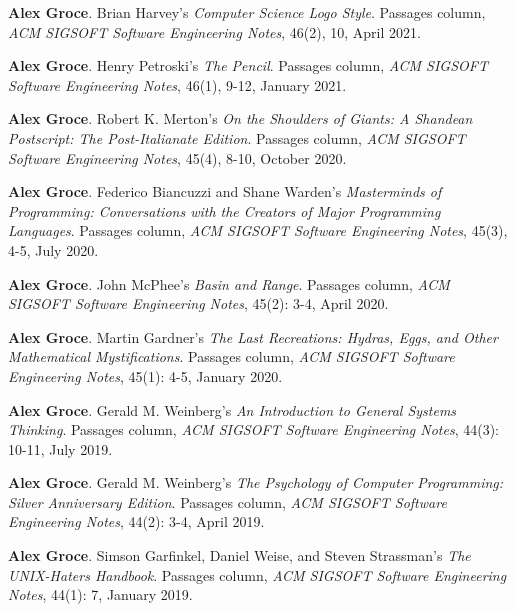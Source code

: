 \documentclass[ComputerScience]{vita}
\begin{document}
\begin{vita}
\begin{Columns, Book Reviews, and Magazine Articles}
\item {\bf Alex Groce}. 
\newblock Brian Harvey's \emph{Computer Science Logo Style}. 
\newblock Passages column, \emph{ACM SIGSOFT Software Engineering 
  Notes}, 46(2), 10, April 2021.

\item {\bf Alex Groce}. 
\newblock Henry Petroski's \emph{The Pencil}. 
\newblock Passages column, \emph{ACM SIGSOFT Software Engineering 
  Notes}, 46(1), 9-12, January 2021.
  
\item {\bf Alex Groce}. 
\newblock Robert K. Merton's \emph{On the Shoulders of Giants: A
  Shandean Postscript: The Post-Italianate Edition}. 
\newblock Passages column, \emph{ACM SIGSOFT Software Engineering 
  Notes}, 45(4), 8-10, October 2020.

\item {\bf Alex Groce}. 
\newblock Federico Biancuzzi and Shane Warden's \emph{Masterminds of 
  Programming: Conversations with the Creators of Major Programming Languages}. 
\newblock Passages column, \emph{ACM SIGSOFT Software Engineering 
  Notes}, 45(3), 4-5, July 2020.
  
\item {\bf Alex Groce}. 
\newblock John McPhee's \emph{Basin and Range}. 
\newblock Passages column, \emph{ACM SIGSOFT Software Engineering 
  Notes}, 45(2): 3-4, April 2020.
  
\item {\bf Alex Groce}. 
\newblock Martin Gardner's \emph{The Last Recreations: Hydras, Eggs, and Other Mathematical Mystifications}. 
\newblock Passages column, \emph{ACM SIGSOFT Software Engineering 
  Notes}, 45(1): 4-5, January 2020.
  
\item {\bf Alex Groce}. 
\newblock Gerald M. Weinberg's \emph{An Introduction to General
  Systems Thinking}.
\newblock Passages column, \emph{ACM SIGSOFT Software Engineering
  Notes}, 44(3): 10-11, July 2019.
  
\item {\bf Alex Groce}. 
\newblock Gerald M. Weinberg's \emph{The Psychology of Computer
  Programming: Silver Anniversary Edition}.
\newblock Passages column, \emph{ACM SIGSOFT Software Engineering
  Notes}, 44(2): 3-4, April 2019.
  
\item {\bf Alex Groce}.
\newblock Simson Garfinkel, Daniel Weise, and Steven Strassman's \emph{The UNIX-Haters Handbook}. 
\newblock Passages column, \emph{ACM SIGSOFT Software Engineering 
  Notes}, 44(1): 7, January 2019.


\end{Columns, Book Reviews, and Magazine Articles}
\end{vita}
\end{document}
